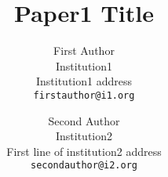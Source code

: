 \begin{comment}

\documentclass[10pt,twocolumn,letterpaper]{article}

\usepackage[pagenumbers]{cvpr} %

\usepackage{graphicx}
\usepackage{amsmath}
\usepackage{amssymb}
\usepackage{booktabs}


%
\usepackage[pagebackref,breaklinks,colorlinks]{hyperref}


\usepackage[capitalize]{cleveref}
\crefname{section}{Sec.}{Secs.}
\Crefname{section}{Section}{Sections}
\Crefname{table}{Table}{Tables}
\crefname{table}{Tab.}{Tabs.}


\def\cvprPaperID{*****} %
\def\confName{CVPR}
\def\confYear{2023}
\end{comment}


\title{Paper1 Title}

\author{First Author\\
Institution1\\
Institution1 address\\
{\tt\small firstauthor@i1.org}
\and
Second Author\\
Institution2\\
First line of institution2 address\\
{\tt\small secondauthor@i2.org}
}
\maketitle

